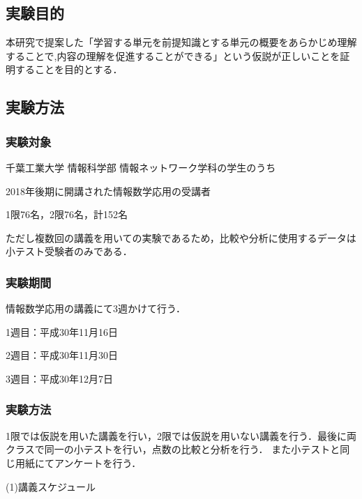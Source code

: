 \documentclass[a4j,12pt]{jsarticle}
\begin{document}
\subsection{実験目的}
本研究で提案した「学習する単元を前提知識とする単元の概要をあらかじめ理解することで,内容の理解を促進することができる」という仮説が正しいことを証明することを目的とする．

\subsection{実験方法}
\subsubsection{実験対象}

千葉工業大学 情報科学部 情報ネットワーク学科の学生のうち

2018年後期に開講された情報数学応用の受講者

1限76名，2限76名，計152名

ただし複数回の講義を用いての実験であるため，比較や分析に使用するデータは小テスト受験者のみである．


\subsubsection{実験期間}

情報数学応用の講義にて3週かけて行う．

1週目：平成30年11月16日

2週目：平成30年11月30日

3週目：平成30年12月7日



\subsubsection{実験方法}

1限では仮説を用いた講義を行い，2限では仮説を用いない講義を行う．最後に両クラスで同一の小テストを行い，点数の比較と分析を行う．
また小テストと同じ用紙にてアンケートを行う．

(1)講義スケジュール
\end{document}
